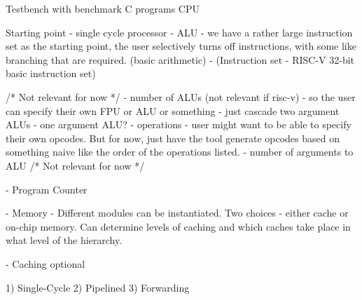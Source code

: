 Testbench with benchmark C programs
CPU

Starting point - single cycle processor
- ALU
	- we have a rather large instruction set as the starting point, the user selectively turns off instructions, with some like branching that are required. (basic arithmetic) - (Instruction set - RISC-V 32-bit basic instruction set)

	/* Not relevant for now */
	- number of ALUs (not relevant if risc-v)
		- so the user can specify their own FPU or ALU or something
		- just cascade two argument ALUs
		- one argument ALU?
	- operations
		- user might want to be able to specify their own opcodes. But for now, just have the tool generate opcodes based on something naive like the order of the operations listed.
	- number of arguments to ALU
	/* Not relevant for now */

- Program Counter

- Memory
	- Different modules can be instantiated. Two choices - either cache or on-chip memory. Can determine levels of caching and which caches take place in what level of the hierarchy.

- Caching optional

1) Single-Cycle
2) Pipelined
3) Forwarding
